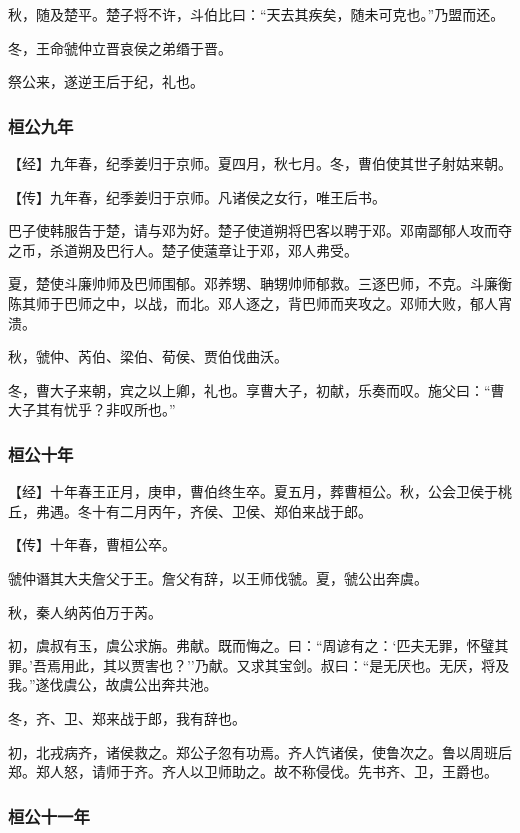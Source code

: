 \documentclass[]{article}
\begin{document}
秋，随及楚平。楚子将不许，斗伯比曰：``天去其疾矣，随未可克也。''乃盟而还。

冬，王命虢仲立晋哀侯之弟缗于晋。

祭公来，遂逆王后于纪，礼也。

\hypertarget{header-n253}{%
\subsubsection{桓公九年}\label{header-n253}}

【经】九年春，纪季姜归于京师。夏四月，秋七月。冬，曹伯使其世子射姑来朝。

【传】九年春，纪季姜归于京师。凡诸侯之女行，唯王后书。

巴子使韩服告于楚，请与邓为好。楚子使道朔将巴客以聘于邓。邓南鄙郁人攻而夺之币，杀道朔及巴行人。楚子使薳章让于邓，邓人弗受。

夏，楚使斗廉帅师及巴师围郁。邓养甥、聃甥帅师郁救。三逐巴师，不克。斗廉衡陈其师于巴师之中，以战，而北。邓人逐之，背巴师而夹攻之。邓师大败，郁人宵溃。

秋，虢仲、芮伯、梁伯、荀侯、贾伯伐曲沃。

冬，曹大子来朝，宾之以上卿，礼也。享曹大子，初献，乐奏而叹。施父曰：``曹大子其有忧乎？非叹所也。''

\hypertarget{header-n262}{%
\subsubsection{桓公十年}\label{header-n262}}

【经】十年春王正月，庚申，曹伯终生卒。夏五月，葬曹桓公。秋，公会卫侯于桃丘，弗遇。冬十有二月丙午，齐侯、卫侯、郑伯来战于郎。

【传】十年春，曹桓公卒。

虢仲谮其大夫詹父于王。詹父有辞，以王师伐虢。夏，虢公出奔虞。

秋，秦人纳芮伯万于芮。

初，虞叔有玉，虞公求旃。弗献。既而悔之。曰：``周谚有之：`匹夫无罪，怀璧其罪。'吾焉用此，其以贾害也？''乃献。又求其宝剑。叔曰：``是无厌也。无厌，将及我。''遂伐虞公，故虞公出奔共池。

冬，齐、卫、郑来战于郎，我有辞也。

初，北戎病齐，诸侯救之。郑公子忽有功焉。齐人饩诸侯，使鲁次之。鲁以周班后郑。郑人怒，请师于齐。齐人以卫师助之。故不称侵伐。先书齐、卫，王爵也。

\hypertarget{header-n272}{%
\subsubsection{桓公十一年}\label{header-n272}}
\end{document}
